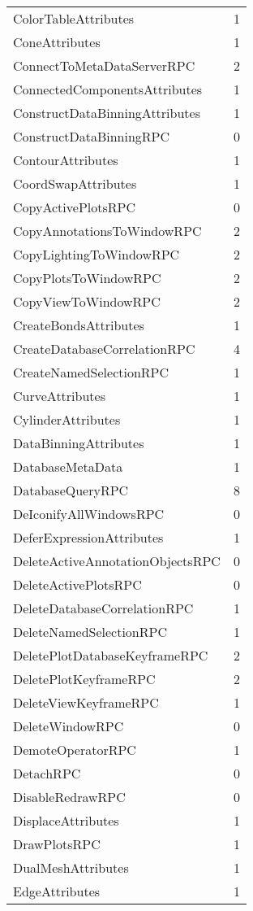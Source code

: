 \documentclass[10pt,a4paper]{report}
\begin{document}
\begin{longtable}{ll}
ColorTableAttributes & 1 \\
ConeAttributes & 1 \\
ConnectToMetaDataServerRPC & 2 \\
ConnectedComponentsAttributes & 1 \\
ConstructDataBinningAttributes & 1 \\
ConstructDataBinningRPC & 0 \\
ContourAttributes & 1 \\
CoordSwapAttributes & 1 \\
CopyActivePlotsRPC & 0 \\
CopyAnnotationsToWindowRPC & 2 \\
CopyLightingToWindowRPC & 2 \\
CopyPlotsToWindowRPC & 2 \\
CopyViewToWindowRPC & 2 \\
CreateBondsAttributes & 1 \\
CreateDatabaseCorrelationRPC & 4 \\
CreateNamedSelectionRPC & 1 \\
CurveAttributes & 1 \\
CylinderAttributes & 1 \\
DataBinningAttributes & 1 \\
DatabaseMetaData & 1 \\
DatabaseQueryRPC & 8 \\
DeIconifyAllWindowsRPC & 0 \\
DeferExpressionAttributes & 1 \\
DeleteActiveAnnotationObjectsRPC & 0 \\
DeleteActivePlotsRPC & 0 \\
DeleteDatabaseCorrelationRPC & 1 \\
DeleteNamedSelectionRPC & 1 \\
DeletePlotDatabaseKeyframeRPC & 2 \\
DeletePlotKeyframeRPC & 2 \\
DeleteViewKeyframeRPC & 1 \\
DeleteWindowRPC & 0 \\
DemoteOperatorRPC & 1 \\
DetachRPC & 0 \\
DisableRedrawRPC & 0 \\
DisplaceAttributes & 1 \\
DrawPlotsRPC & 1 \\
DualMeshAttributes & 1 \\
EdgeAttributes & 1 \\

\end{longtable}
\end{document}
